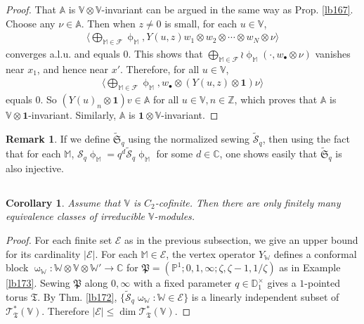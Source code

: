 \documentclass[12pt,a4paper,notitlepage]{article}
\theoremstyle{definition}
\newtheorem{rem}[df]{Remark}
\theoremstyle{plain}
\newtheorem{co}[df]{Corollary}
\newcommand{\fk}{\mathfrak}
\newcommand{\mc}{\mathcal}
\newcommand{\wtd}{\widetilde}
\newcommand{\id}{\mathbf{1}}
\newcommand{\bigbk}[1]{\big\langle {#1}\big\rangle}
\newcommand{\scr}{\mathscr}
\newcommand{\blt}{\bullet}
\newcommand{\Vbb}{\mathbb V}
\newcommand{\Abb}{\mathbb A}
\newcommand{\Wbb}{\mathbb W}
\newcommand{\Mbb}{\mathbb M}
\newcommand{\Cbb}{\mathbb C}
\newcommand{\Zbb}{\mathbb Z}
\newcommand{\Pbb}{\mathbb P}
\newcommand{\Dbb}{\mathbb D}
\numberwithin{equation}{section}
\begin{document}
\begin{proof}
That $\Abb$ is $\Vbb\otimes\Vbb$-invariant can be argued in the same way as Prop. \ref{lb167}. Choose any $\nu\in\Abb$. Then when $z\neq 0$ is small, for each $u\in\Vbb$,
\begin{align}
\bigbk{\bigoplus_{\Mbb\in\mc F}\upphi_\Mbb,Y(u,z)w_1\otimes w_2\otimes\cdots\otimes w_N\otimes\nu}
\end{align}
converges a.l.u. and equals $0$. This shows that $\bigoplus_{\Mbb\in\mc F}\wr\upphi_\Mbb(\cdot,w_\blt\otimes\nu)$ vanishes near $x_1$, and hence near $x'$. Therefore, for all $u\in\Vbb$,
\begin{align*}
\bigbk{\bigoplus_{\Mbb\in\mc F}\upphi_\Mbb,w_\blt\otimes(Y(u,z)\otimes \id)\nu}
\end{align*}
equals $0$. So $(Y(u)_n\otimes\id)v\in\Abb$ for all $u\in\Vbb,n\in\Zbb$, which proves that $\Abb$ is $\Vbb\otimes\id$-invariant. Similarly, $\Abb$ is $\id\otimes\Vbb$-invariant.
\end{proof}

\begin{rem}
If we define $\wtd{\fk S}_q$ using the normalized sewing $\wtd{\mc S}_q$,  then using the fact that for each $\Mbb$, $\mc S_q\upphi_\Mbb=q^d\wtd{\mc S}_q\upphi_\Mbb$ for some $d\in\Cbb$, one shows easily that $\wtd{\fk S}_q$ is also injective.
\end{rem}


\subsection{}


\begin{co}\label{lb174}
Assume that $\Vbb$ is $C_2$-cofinite. Then there are only finitely many equivalence classes of irreducible $\Vbb$-modules.
\end{co}


\begin{proof}
For each finite set $\mc E$  as in the previous subsection, we give an upper bound for its cardinality $|\mc E|$. For each $\Mbb\in\mc E$, the vertex operator $Y_\Wbb$ defines a conformal block $\upomega_\Wbb:\Wbb\otimes\Vbb\otimes\Wbb'\rightarrow\Cbb$ for $\fk P=(\Pbb^1;0,1,\infty;\zeta,\zeta-1,1/\zeta)$ as in Example \ref{lb173}. Sewing $\fk P$ along $0,\infty$ with a fixed parameter $q\in\Dbb_1^\times$ gives a $1$-pointed torus $\fk T$. By Thm. \ref{lb172}, $\{\wtd{\mc S}_q\upomega_\Wbb:\Wbb\in\mc E\}$ is a linearly independent subset of $\scr T_{\fk T}^*(\Vbb)$. Therefore $|\mc E|\leq \dim\scr T_{\fk T}^*(\Vbb)$.
\end{proof}
\end{document}
